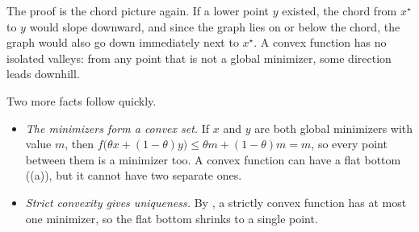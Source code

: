 The proof is the chord picture again. If a lower point $y$ existed, the
chord from $x^\star$ to $y$ would slope downward, and since the graph lies
on or below the chord, the graph would also go down immediately next to
$x^\star$. A convex function has no isolated valleys: from any point that is
not a global minimizer, some direction leads downhill.

Two more facts follow quickly.
\begin{itemize}
  \item \emph{The minimizers form a convex set.} If $x$ and $y$ are both
    global minimizers with value $m$, then
    $f\bigl(\theta x + (1 - \theta) y\bigr) \le \theta m + (1 - \theta) m
    = m$, so every point between them is a minimizer too. A convex function
    can have a flat bottom ((a)), but it cannot
    have two separate ones.
  \item \emph{Strict convexity gives uniqueness.} By
    , a strictly convex function has at most one
    minimizer, so the flat bottom shrinks to a single point.
\end{itemize}

